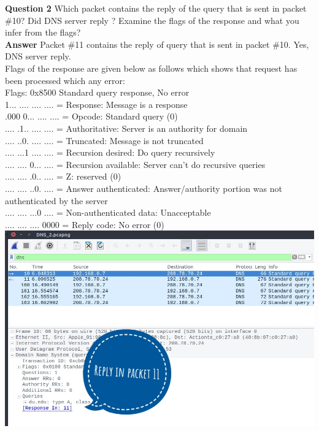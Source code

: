 \documentclass[14pt]{extarticle}
\begin{document}
    \noindent
    \textbf{\large Question 2}
    Which packet contains the reply of the query that is sent in packet \#10?
    Did DNS server reply ? Examine the flags of the response and what you infer from the flags?\\[10pt]
    \textbf{\large Answer}
    Packet \#11 contains the reply of query that is sent in packet \#10. Yes, DNS server reply.\\
    Flags of the response are given below as follows which shows that request has been processed which any error:\\
    Flags: 0x8500 Standard query response, No error\\
    1... .... .... .... = Response: Message is a response\\
    .000 0... .... .... = Opcode: Standard query (0)\\
    .... .1.. .... .... = Authoritative: Server is an authority for domain\\
    .... ..0. .... .... = Truncated: Message is not truncated\\
    .... ...1 .... .... = Recursion desired: Do query recursively\\
    .... .... 0... .... = Recursion available: Server can't do recursive queries\\
    .... .... .0.. .... = Z: reserved (0)\\
    .... .... ..0. .... = Answer authenticated: Answer/authority portion was not authenticated by the server\\
    .... .... ...0 .... = Non-authenticated data: Unacceptable\\
    .... .... .... 0000 = Reply code: No error (0)\\[10pt]
    \includegraphics[scale=0.45]{2_2_1}\\[10pt] 
\end{document}
